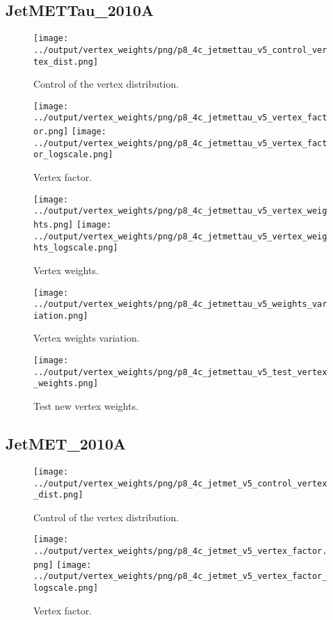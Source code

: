 \documentclass[11pt]{book}
\begin{document}
\subsection{JetMETTau\_2010A}
\begin{figure}[ht]
\centering
\texttt{[image: ../output/vertex\_weights/png/p8\_4c\_jetmettau\_v5\_control\_vertex\_dist.png]}
\caption{Control of the vertex distribution.}
\end{figure}

\begin{figure}[ht]
\centering
\texttt{[image: ../output/vertex\_weights/png/p8\_4c\_jetmettau\_v5\_vertex\_factor.png]}
\texttt{[image: ../output/vertex\_weights/png/p8\_4c\_jetmettau\_v5\_vertex\_factor\_logscale.png]}
\caption{Vertex factor.}
\end{figure}

\begin{figure}[ht]
\centering
\texttt{[image: ../output/vertex\_weights/png/p8\_4c\_jetmettau\_v5\_vertex\_weights.png]}
\texttt{[image: ../output/vertex\_weights/png/p8\_4c\_jetmettau\_v5\_vertex\_weights\_logscale.png]}
\caption{Vertex weights.}
\end{figure}

\begin{figure}[ht]
\centering
\texttt{[image: ../output/vertex\_weights/png/p8\_4c\_jetmettau\_v5\_weights\_variation.png]}
\caption{Vertex weights variation.}
\end{figure}

\begin{figure}[ht]
\centering
\texttt{[image: ../output/vertex\_weights/png/p8\_4c\_jetmettau\_v5\_test\_vertex\_weights.png]}
\caption{Test new vertex weights.}
\end{figure}
\clearpage

\subsection{JetMET\_2010A}
\begin{figure}[ht]
\centering
\texttt{[image: ../output/vertex\_weights/png/p8\_4c\_jetmet\_v5\_control\_vertex\_dist.png]}
\caption{Control of the vertex distribution.}
\end{figure}

\begin{figure}[ht]
\centering
\texttt{[image: ../output/vertex\_weights/png/p8\_4c\_jetmet\_v5\_vertex\_factor.png]}
\texttt{[image: ../output/vertex\_weights/png/p8\_4c\_jetmet\_v5\_vertex\_factor\_logscale.png]}
\caption{Vertex factor.}
\end{figure}
\end{document}
